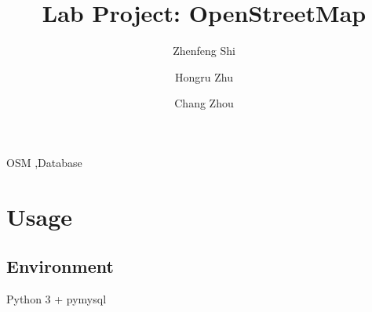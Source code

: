\documentclass[final,1p,times]{elsarticle}
\begin{document}
\begin{frontmatter}


\title{Lab Project: OpenStreetMap}




\author{Zhenfeng Shi}
\author{Hongru Zhu}
\author{Chang Zhou}

\address{jack.shi2013@gmail.com}

\begin{abstract}

\end{abstract}

\begin{keyword}
OSM \sep Database


\end{keyword}

\end{frontmatter}

\linenumbers

\section{Usage}
\subsection{Environment}
Python 3 + pymysql 
\end{document}

